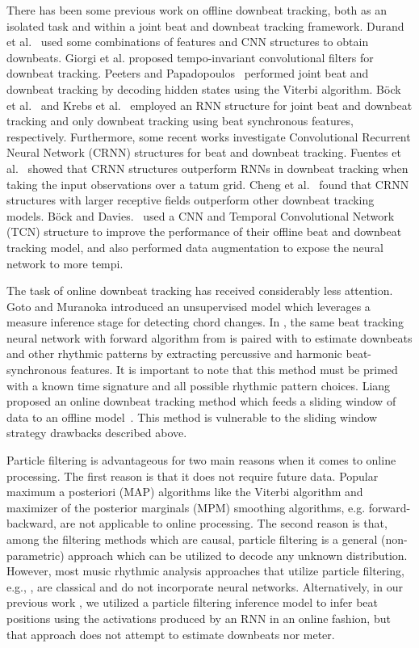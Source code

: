 \documentclass{article}
\begin{document}
There has been some previous work on offline downbeat tracking, both as an isolated task and within a joint beat and downbeat tracking framework. Durand et al.~\cite{durand:1,durand:2,durand:3} used some combinations of features and CNN structures to obtain downbeats. Giorgi et al. \cite{Giorgi} proposed tempo-invariant convolutional filters for downbeat tracking. Peeters and Papadopoulos~\cite{Petters} performed joint beat and downbeat tracking by decoding hidden states using the Viterbi algorithm. Böck et al.~\cite{Bock:1} and Krebs et al.~\cite{krebs} employed an RNN structure for joint beat and downbeat tracking and only downbeat tracking using beat synchronous features, respectively. Furthermore, some recent works investigate Convolutional Recurrent Neural Network (CRNN) structures for beat and downbeat tracking. Fuentes et al.~\cite{Fuentes:01} showed that CRNN structures outperform RNNs in downbeat tracking when taking the input observations over a tatum grid. Cheng et al.~\cite{Cheng} found that CRNN structures with larger receptive fields outperform other downbeat tracking models. Böck and Davies.~\cite{bock:07} used a CNN and Temporal Convolutional Network (TCN) structure to improve the performance of their offline beat and downbeat tracking model, and also performed data augmentation to expose the neural network to more tempi.  


The task of online downbeat tracking has received considerably less attention. Goto and Muranoka \cite{goto:2} introduced an unsupervised model which leverages a measure inference stage for detecting chord changes. In \cite{Bock:5}, the same beat tracking neural network with forward algorithm from \cite{Bock:1,Bock:2} is paired with \cite{krebs} to estimate downbeats and other rhythmic patterns by extracting percussive and harmonic beat-synchronous features. It is important to note that this method must be primed with a known time signature and all possible rhythmic pattern choices. Liang~\cite{Liang} proposed an online downbeat tracking method which feeds a sliding window of data to an offline model~\cite{durand:3}. This method is vulnerable to the sliding window strategy drawbacks described above.



Particle filtering is advantageous for two main reasons when it comes to online processing. The first reason is that it does not require future data. Popular maximum a posteriori (MAP) algorithms like the Viterbi algorithm and maximizer of the posterior marginals (MPM) smoothing algorithms, e.g. forward-backward, are not applicable to online processing. The second reason is that, among the filtering methods which are causal, particle filtering is a general (non-parametric) approach which can be utilized to decode any unknown distribution. However, most music rhythmic analysis approaches that utilize particle filtering, e.g., \cite{Hainsworth,Hainsworth:1,Cemgil,Krebs:3}, are classical and do not incorporate neural networks. Alternatively, in our previous work \cite{Heydari}, we utilized a particle filtering inference model to infer beat positions using the activations produced by an RNN in an online fashion, but that approach does not attempt to estimate downbeats nor meter.
\end{document}
